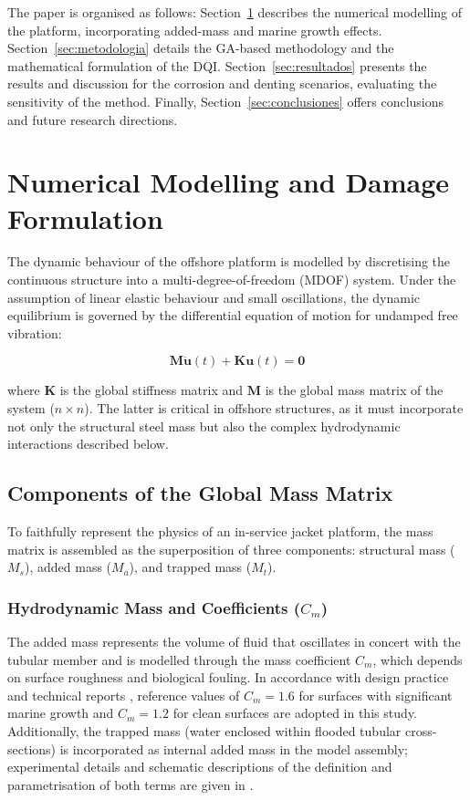 \documentclass[a4paper,fleqn,nologo]{cas-dc}
\begin{document}
The paper is organised as follows: Section~\ref{sec:modelado} describes the numerical modelling of the platform, incorporating added-mass and marine growth effects. Section~\ref{sec:metodologia} details the GA-based methodology and the mathematical formulation of the DQI. Section~\ref{sec:resultados} presents the results and discussion for the corrosion and denting scenarios, evaluating the sensitivity of the method. Finally, Section~\ref{sec:conclusiones} offers conclusions and future research directions.

\section{Numerical Modelling and Damage Formulation}
\label{sec:modelado}

The dynamic behaviour of the offshore platform is modelled by discretising the continuous structure into a multi-degree-of-freedom (MDOF) system. Under the assumption of linear elastic behaviour and small oscillations, the dynamic equilibrium is governed by the differential equation of motion for undamped free vibration:

\begin{equation}
    \label{eq:ec_movimiento}
    \mathbf{M}\ddot{\mathbf{u}}(t) + \mathbf{K}\mathbf{u}(t) = \mathbf{0}
\end{equation}

\noindent where $\mathbf{K}$ is the global stiffness matrix and $\mathbf{M}$ is the global mass matrix of the system ($n \times n$). The latter is critical in offshore structures, as it must incorporate not only the structural steel mass but also the complex hydrodynamic interactions described below.

\subsection{Components of the Global Mass Matrix}

To faithfully represent the physics of an in-service jacket platform, the mass matrix is assembled as the superposition of three components: structural mass ($M_s$), added mass ($M_a$), and trapped mass ($M_t$).

\subsubsection{Hydrodynamic Mass and Coefficients (\texorpdfstring{$C_m$}{Cm})}
The added mass represents the volume of fluid that oscillates in concert with the tubular member and is modelled through the mass coefficient $C_m$, which depends on surface roughness and biological fouling. In accordance with design practice and technical reports \citep{API2014_manual,CardenasArias2019_article}, reference values of $C_m=1.6$ for surfaces with significant marine growth and $C_m=1.2$ for clean surfaces are adopted in this study. Additionally, the trapped mass (water enclosed within flooded tubular cross-sections) is incorporated as internal added mass in the model assembly; experimental details and schematic descriptions of the definition and parametrisation of both terms are given in \citep{CardenasArias2019_article}.
\end{document}

